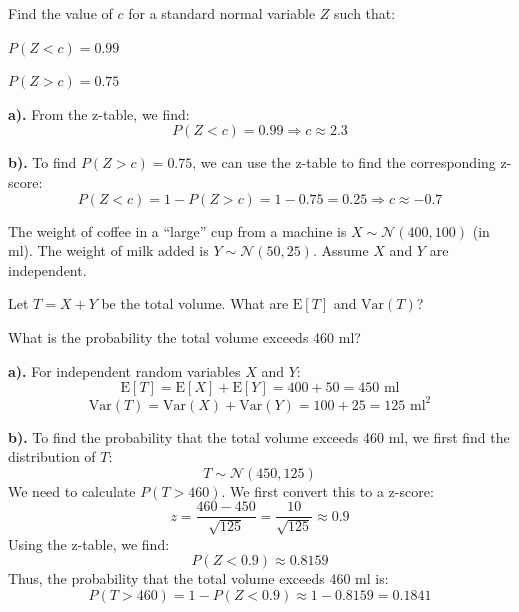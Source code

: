 \documentclass[a4paper, 10pt]{article}
\begin{document}
\begin{problem}
Find the value of \( c \) for a standard normal variable \( Z \) such that:
\begin{subproblems_alpha}
	\item \( P(Z < c) = 0.99 \)
	\item \( P(Z > c) = 0.75 \)
\end{subproblems_alpha}
\end{problem}

\begin{solution}
	\textbf{a).} From the z-table, we find:
	\[ P(Z < c) = 0.99 \Rightarrow c \approx \boxed{2.3} \]

	\textbf{b).} To find \( P(Z > c) = 0.75 \), we can use the z-table to find the corresponding z-score:
	\[ P(Z < c) = 1 - P(Z > c) = 1 - 0.75 = 0.25 \Rightarrow c \approx \boxed{-0.7} \]
\end{solution}

\newpage

\begin{problem}
The weight of coffee in a ``large'' cup from a machine is \( X \sim \mathcal{N}(400, 100) \) (in ml).
The weight of milk added is \( Y \sim \mathcal{N}(50, 25) \). Assume \( X \) and \( Y \) are independent.
\begin{subproblems_alpha}
	\item Let \( T = X + Y \) be the total volume. What are \( \text{E}[T] \) and \( \text{Var}(T) \)?
	\item  What is the probability the total volume exceeds 460 ml?
\end{subproblems_alpha}
\end{problem}

\begin{solution}
	\textbf{a).} For independent random variables \( X \) and \( Y \):
	\[ \text{E}[T] = \text{E}[X] + \text{E}[Y] = 400 + 50 = \boxed{450 \text{ ml}} \]
	\[ \text{Var}(T) = \text{Var}(X) + \text{Var}(Y) = 100 + 25 = \boxed{125 \text{ ml}^2} \]

	\textbf{b).} To find the probability that the total volume exceeds 460 ml, we first find the distribution of \( T \):
	\[ T \sim \mathcal{N}(450, 125) \]
	We need to calculate \( P(T > 460) \). We first convert this to a z-score:
	\[ z = \frac{460 - 450}{\sqrt{125}} = \frac{10}{\sqrt{125}} \approx 0.9 \]
	Using the z-table, we find:
	\[ P(Z < 0.9) \approx 0.8159 \]
	Thus, the probability that the total volume exceeds 460 ml is:
	\[ P(T > 460) = 1 - P(Z < 0.9) \approx 1 - 0.8159 = \boxed{0.1841} \]
\end{solution}
\end{document}
